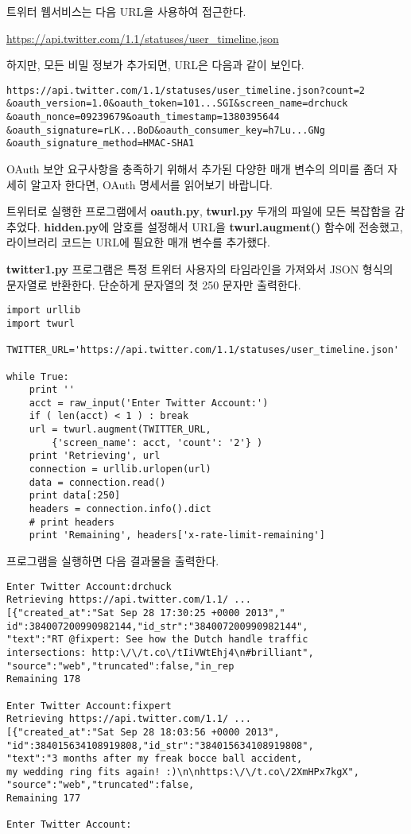 트위터 웹서비스는 다음 URL을 사용하여 접근한다.

\url{https://api.twitter.com/1.1/statuses/user_timeline.json}

하지만, 모든 비밀 정보가 추가되면, URL은 다음과 같이 보인다.

\beforeverb
\begin{verbatim}
https://api.twitter.com/1.1/statuses/user_timeline.json?count=2
&oauth_version=1.0&oauth_token=101...SGI&screen_name=drchuck
&oauth_nonce=09239679&oauth_timestamp=1380395644
&oauth_signature=rLK...BoD&oauth_consumer_key=h7Lu...GNg
&oauth_signature_method=HMAC-SHA1
\end{verbatim}
\afterverb
%

OAuth 보안 요구사항을 충족하기 위해서 추가된 다양한 매개 변수의 의미를 좀더 자세히 알고자 한다면,
OAuth 명세서를 읽어보기 바랍니다.

트위터로 실행한 프로그램에서 {\bf oauth.py}, {\bf twurl.py} 두개의 파일에 모든 복잡함을 감추었다.
{\bf hidden.py}에 암호를 설정해서 URL을 {\bf twurl.augment()} 함수에 전송했고,
라이브러리 코드는 URL에 필요한 매개 변수를 추가했다.

{\bf twitter1.py} 프로그램은 특정 트위터 사용자의 타임라인을 가져와서 JSON 형식의 문자열로 반환한다.
단순하게 문자열의 첫 250 문자만 출력한다.

\beforeverb
\begin{verbatim}
import urllib
import twurl

TWITTER_URL='https://api.twitter.com/1.1/statuses/user_timeline.json'

while True:
    print ''
    acct = raw_input('Enter Twitter Account:')
    if ( len(acct) < 1 ) : break
    url = twurl.augment(TWITTER_URL,
        {'screen_name': acct, 'count': '2'} )
    print 'Retrieving', url
    connection = urllib.urlopen(url)
    data = connection.read()
    print data[:250]
    headers = connection.info().dict
    # print headers
    print 'Remaining', headers['x-rate-limit-remaining']
\end{verbatim}
\afterverb
%

프로그램을 실행하면 다음 결과물을 출력한다.

\beforeverb
\begin{verbatim}
Enter Twitter Account:drchuck
Retrieving https://api.twitter.com/1.1/ ...
[{"created_at":"Sat Sep 28 17:30:25 +0000 2013","
id":384007200990982144,"id_str":"384007200990982144",
"text":"RT @fixpert: See how the Dutch handle traffic 
intersections: http:\/\/t.co\/tIiVWtEhj4\n#brilliant",
"source":"web","truncated":false,"in_rep
Remaining 178

Enter Twitter Account:fixpert
Retrieving https://api.twitter.com/1.1/ ...
[{"created_at":"Sat Sep 28 18:03:56 +0000 2013",
"id":384015634108919808,"id_str":"384015634108919808",
"text":"3 months after my freak bocce ball accident, 
my wedding ring fits again! :)\n\nhttps:\/\/t.co\/2XmHPx7kgX",
"source":"web","truncated":false,
Remaining 177

Enter Twitter Account:
\end{verbatim}
\afterverb
%

